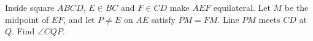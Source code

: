 Inside square $ABCD$, $E\in BC$ and $F\in CD$ make $AEF$ equilateral. Let $M$ be the midpoint of $EF$, and let $P\ne E$ on $AE$ satisfy $PM=FM$. Line $PM$ meets $CD$ at $Q$. Find $\angle CQP$.
